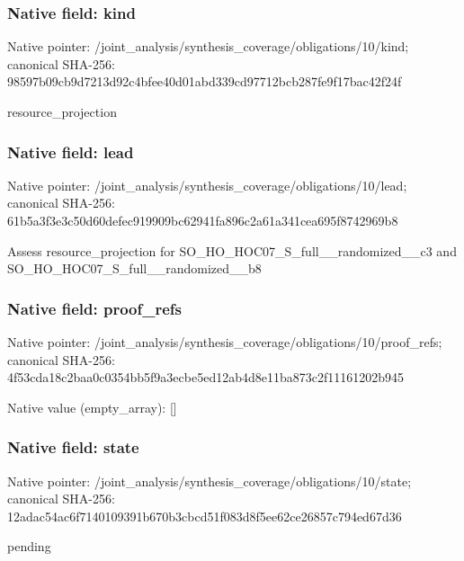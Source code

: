\documentclass[10pt,a4paper]{article}
\begin{document}
\subsubsection{Native field: kind}
Native pointer: /joint\_\allowbreak{}analysis/synthesis\_\allowbreak{}coverage/obligations/10/kind; canonical SHA-256: 98597b09cb9d7213d92c4bfee40d01abd339cd97712bcb287fe9f17bac42f24f

\begingroup\raggedright\sloppy resource\_\allowbreak{}projection\par\endgroup

\subsubsection{Native field: lead}
Native pointer: /joint\_\allowbreak{}analysis/synthesis\_\allowbreak{}coverage/obligations/10/lead; canonical SHA-256: 61b5a3f3e3c50d60defec919909bc62941fa896c2a61a341cea695f8742969b8

\begingroup\raggedright\sloppy Assess resource\_\allowbreak{}projection for SO\_\allowbreak{}HO\_\allowbreak{}HOC07\_\allowbreak{}S\_\allowbreak{}full\_\allowbreak{}\_\allowbreak{}randomized\_\allowbreak{}\_\allowbreak{}c3 and SO\_\allowbreak{}HO\_\allowbreak{}HOC07\_\allowbreak{}S\_\allowbreak{}full\_\allowbreak{}\_\allowbreak{}randomized\_\allowbreak{}\_\allowbreak{}b8\par\endgroup

\subsubsection{Native field: proof\_\allowbreak{}refs}
Native pointer: /joint\_\allowbreak{}analysis/synthesis\_\allowbreak{}coverage/obligations/10/proof\_\allowbreak{}refs; canonical SHA-256: 4f53cda18c2baa0c0354bb5f9a3ecbe5ed12ab4d8e11ba873c2f11161202b945

Native value (empty\_\allowbreak{}array): []

\subsubsection{Native field: state}
Native pointer: /joint\_\allowbreak{}analysis/synthesis\_\allowbreak{}coverage/obligations/10/state; canonical SHA-256: 12adac54ac6f7140109391b670b3cbcd51f083d8f5ee62ce26857c794ed67d36

\begingroup\raggedright\sloppy pending\par\endgroup
\end{document}
